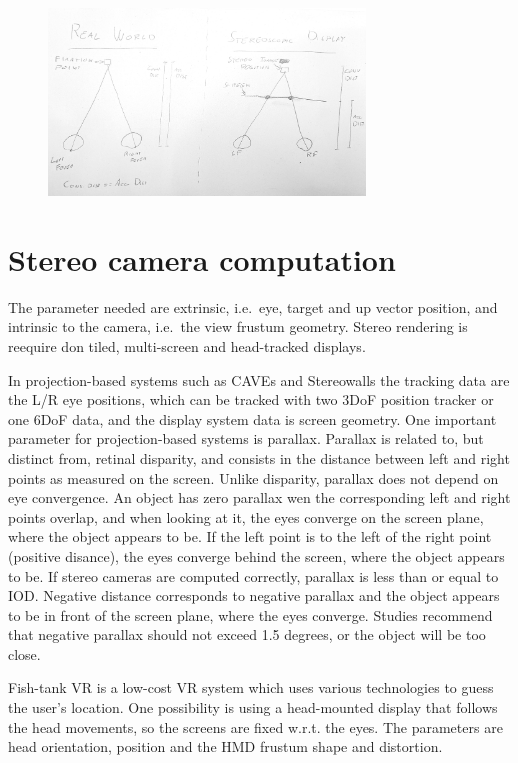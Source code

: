\documentclass[a4paper]{article}
\begin{document}
    \begin{figure}
      \centering
  \includegraphics[width=0.75\textwidth]{acc-vs-conv}
    \end{figure}


\section{Stereo camera computation}

The parameter needed are extrinsic, i.e.~eye, target and up vector
position, and intrinsic to the camera, i.e.~the view frustum geometry.
Stereo rendering is reequire don tiled, multi-screen and head-tracked
displays.

In projection-based systems such as CAVEs and Stereowalls the tracking
data are the L/R eye positions, which can be tracked with two 3DoF
position tracker or one 6DoF data, and the display system data is screen
geometry. One important parameter for projection-based systems is
parallax. Parallax is related to, but distinct from, retinal disparity,
and consists in the distance between left and right points as measured
on the screen. Unlike disparity, parallax does not depend on eye
convergence. An object has zero parallax wen the corresponding left and
right points overlap, and when looking at it, the eyes converge on the
screen plane, where the object appears to be. If the left point is to
the left of the right point (positive disance), the eyes converge behind
the screen, where the object appears to be. If stereo cameras are
computed correctly, parallax is less than or equal to IOD. Negative
distance corresponds to negative parallax and the object appears to be
in front of the screen plane, where the eyes converge. Studies recommend
that negative parallax should not exceed 1.5 degrees, or the object will
be too close.

Fish-tank VR is a low-cost VR system which uses various technologies to
guess the user's location. One possibility is using a head-mounted
display that follows the head movements, so the screens are fixed w.r.t.
the eyes. The parameters are head orientation, position and the HMD
frustum shape and distortion.
\end{document}
